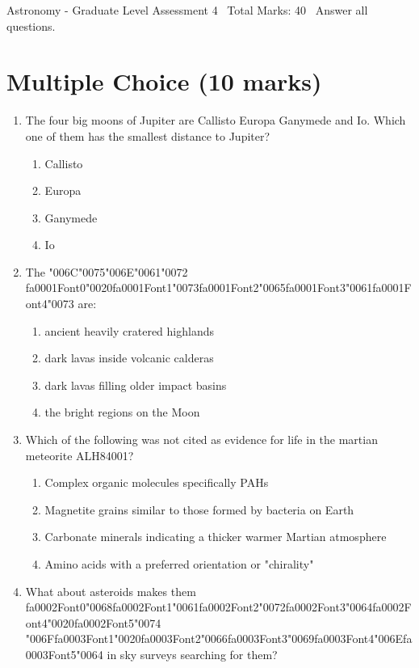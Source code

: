\documentclass[12pt]{article}
\begin{document}
\begin{center}
Astronomy - Graduate Level Assessment 4 \
Total Marks: 40 \
Answer all questions.
\end{center}

\section*{Multiple Choice (10 marks)}
\begin{enumerate}[label=\arabic*.]
\item The four big moons of Jupiter are Callisto Europa Ganymede and Io. Which one of them has
the smallest distance to Jupiter?
\begin{enumerate}[label=(\alph*)]
    \item Callisto
    \item Europa
    \item Ganymede
    \item Io
\end{enumerate}
\item The {\char"006C}{\char"0075}{\char"006E}{\char"0061}{\char"0072} {\csname fa0001Font0\endcsname\char"0020}{\csname fa0001Font1\endcsname\char"0073}{\csname fa0001Font2\endcsname\char"0065}{\csname fa0001Font3\endcsname\char"0061}{\csname fa0001Font4\endcsname\char"0073} are:
\begin{enumerate}[label=(\alph*)]
    \item ancient heavily cratered highlands
    \item dark lavas inside volcanic calderas
    \item dark lavas filling older impact basins
    \item the bright regions on the Moon
\end{enumerate}
\item Which of the following was not cited as evidence for life in the martian meteorite
ALH84001?
\begin{enumerate}[label=(\alph*)]
    \item Complex organic molecules specifically PAHs
    \item Magnetite grains similar to those formed by bacteria on Earth
    \item Carbonate minerals indicating a thicker warmer Martian atmosphere
    \item Amino acids with a preferred orientation or "chirality"
\end{enumerate}
\item What about asteroids makes them {\csname fa0002Font0\endcsname\char"0068}{\csname fa0002Font1\endcsname\char"0061}{\csname fa0002Font2\endcsname\char"0072}{\csname fa0002Font3\endcsname\char"0064}{\csname fa0002Font4\endcsname\char"0020}{\csname fa0002Font5\endcsname\char"0074} {\char"006F}{\csname fa0003Font1\endcsname\char"0020}{\csname fa0003Font2\endcsname\char"0066}{\csname fa0003Font3\endcsname\char"0069}{\csname fa0003Font4\endcsname\char"006E}{\csname fa0003Font5\endcsname\char"0064} in sky surveys searching for them?

\end{enumerate}
\end{document}
